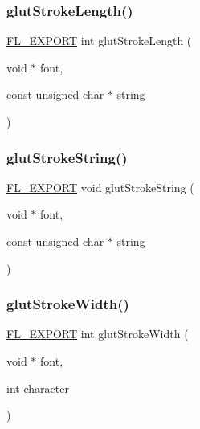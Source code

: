 \subsubsection{\texorpdfstring{glut\+Stroke\+Length()}{glutStrokeLength()}}
{\footnotesize\ttfamily \hyperlink{_fl___export_8_h_aa9ba29a18aee9d738370a06eeb4470fc}{F\+L\+\_\+\+E\+X\+P\+O\+RT} int glut\+Stroke\+Length (\begin{DoxyParamCaption}\item[{void $\ast$}]{font,  }\item[{const unsigned char $\ast$}]{string }\end{DoxyParamCaption})}

\mbox{\label{glut_8_h_a1381db597633da399e5e6143c2569aca}} 
\subsubsection{\texorpdfstring{glut\+Stroke\+String()}{glutStrokeString()}}
{\footnotesize\ttfamily \hyperlink{_fl___export_8_h_aa9ba29a18aee9d738370a06eeb4470fc}{F\+L\+\_\+\+E\+X\+P\+O\+RT} void glut\+Stroke\+String (\begin{DoxyParamCaption}\item[{void $\ast$}]{font,  }\item[{const unsigned char $\ast$}]{string }\end{DoxyParamCaption})}

\mbox{\label{glut_8_h_af388599a3d89b6c40090f764f08cfb77}} 
\subsubsection{\texorpdfstring{glut\+Stroke\+Width()}{glutStrokeWidth()}}
{\footnotesize\ttfamily \hyperlink{_fl___export_8_h_aa9ba29a18aee9d738370a06eeb4470fc}{F\+L\+\_\+\+E\+X\+P\+O\+RT} int glut\+Stroke\+Width (\begin{DoxyParamCaption}\item[{void $\ast$}]{font,  }\item[{int}]{character }\end{DoxyParamCaption})}

\mbox{\label{glut_8_h_ad5050e441a7377b71bf5edcce5c1782b}} 
